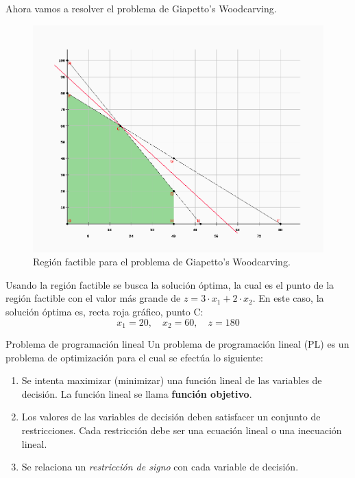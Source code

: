 \documentclass[../main.tex]{subfiles}
\begin{document}
\begin{example}
        Ahora vamos a resolver el problema de Giapetto's Woodcarving.

        \begin{figure}[ht]
            \centering
                \includegraphics[width=1\textwidth]{./images/pl_grafico.png}
                \caption{Región factible para el problema de Giapetto's Woodcarving.}
            \label{fig:figura1}
        \end{figure}

        Usando la región factible se busca la solución óptima, la cual es el punto de la región factible con el valor más grande de $z = 3 \cdot x_1 + 2 \cdot x_2$. En este caso, la solución óptima es, recta roja gráfico, punto C:
        \begin{equation}
            x_1 = 20, \quad x_2 = 60, \quad z = 180
        \end{equation}

                  
    \end{example}

    \begin{teorema}{Problema de programación lineal}{}
        Un problema de programación lineal (PL) es un problema de optimización para el cual se efectúa lo siguiente:
        \begin{enumerate}
            \item Se intenta maximizar (minimizar) una función lineal de las variables de decisión. La función lineal se llama \textbf{función objetivo}.
            \item Los valores de las variables de decisión deben satisfacer un conjunto de restricciones. Cada restricción debe ser una ecuación lineal o una inecuación lineal.
            \item Se relaciona un \textit{restricción de signo} con cada variable de decisión.
        \end{enumerate}
    \end{teorema}
    
\end{document}
